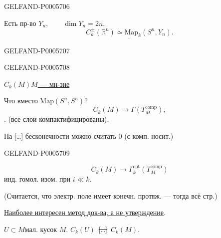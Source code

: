 \begin{GelfandAdjacentEvidence}{GELFAND-P000570}{6}

Есть пр-во \(Y_n,\qquad\dim Y_n=2n\),
\[
\underline{C_k^\pm(\mathbb R^n)\simeq\mathrm{Map}_k(S^n,Y_n)}.
\]
\end{GelfandAdjacentEvidence}
\begin{GelfandAdjacentEvidence}{GELFAND-P000570}{7}

\end{GelfandAdjacentEvidence}
\begin{GelfandAdjacentEvidence}{GELFAND-P000570}{8}

\underline{\(C_k(M)\)}\qquad \underline{\(M\) — мн-зие}

Что вместо \(\mathrm{Map}(S^n,S^n)\)?
\[
C_k(M)\longrightarrow\Gamma(T_M^{\mathrm{comp}}),
\]
. (все слои компактифицированы).

На \sout{[…]} бесконечности можно считать \(0\) (с комп. носит.)
\end{GelfandAdjacentEvidence}
\begin{GelfandAdjacentEvidence}{GELFAND-P000570}{9}

\[
C_k(M)\longrightarrow\Gamma_k^{\mathrm{cpt}}(T_M^{\mathrm{comp}})
\]
инд. гомол. изом. при \(i\ll k\).

(Считается, что электр. поле имеет конечн. протяж. — тогда всё стр.)

\uline{Наиболее интересен метод док-ва, а не утверждение}.

\(U\subset M\)\quad мал. кусок \(M\).
\qquad \(C_k(U)\)\ \sout{[…]}\ \(C_k(M)\).
\end{GelfandAdjacentEvidence}
